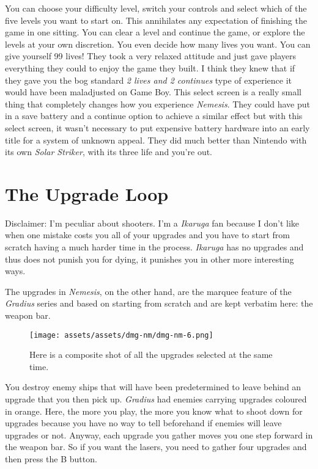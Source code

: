 \documentclass{book}
\begin{document}
You can choose your difficulty level, switch your controls and select which of the five levels you want to start on. This annihilates any expectation of finishing the game in one sitting. You can clear a level and continue the game, or explore the levels at your own discretion. You even decide how many lives you want. You can give yourself 99 lives! They took a very relaxed attitude and just gave players everything they could to enjoy the game they built. I think they knew that if they gave you the bog standard \emph{2 lives and 2 continues} type of experience it would have been maladjusted on Game Boy. This select screen is a really small thing that completely changes how you experience \emph{Nemesis}. They could have put in a save battery and a continue option to achieve a similar effect but with this select screen, it wasn’t necessary to put expensive battery hardware into an early title for a system of unknown appeal. They did much better than Nintendo with its own \emph{Solar Striker}, with its three life and you’re out.

\FloatBarrier\needspace{5pt}\section*{The Upgrade Loop}\nopagebreak[4]

Disclaimer: I’m peculiar about shooters. I’m a \emph{Ikaruga} fan because I don’t like when one mistake costs you all of your upgrades and you have to start from scratch having a much harder time in the process. \emph{Ikaruga} has no upgrades and thus does not punish you for dying, it punishes you in other more interesting ways.

The upgrades in \emph{Nemesis}, on the other hand, are the marquee feature of the \emph{Gradius} series and based on starting from scratch and are kept verbatim here: the weapon bar.

\begin{figure}[hbt]
\vskip 10pt
\centering \texttt{[image: assets/assets/dmg-nm/dmg-nm-6.png]}\par\pagetwodescription Here is a composite shot of all the upgrades selected at the same time.
\vskip 6pt
\end{figure}

You destroy enemy ships that will have been predetermined to leave behind an upgrade that you then pick up. \emph{Gradius} had enemies carrying upgrades coloured in orange. Here, the more you play, the more you know what to shoot down for upgrades because you have no way to tell beforehand if enemies will leave upgrades or not. Anyway, each upgrade you gather moves you one step forward in the weapon bar. So if you want the lasers, you need to gather four upgrades and then press the B button.
\end{document}
